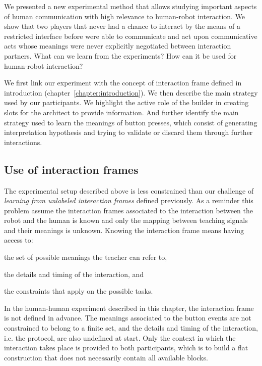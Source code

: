 We presented a new experimental method that allows studying important aspects of human communication with high relevance to human-robot interaction. We show that two players that never had a chance to interact by the means of a restricted interface before were able to communicate and act upon communicative acts whose meanings were never explicitly negotiated between interaction partners. What can we learn from the experiments? How can it be used for human-robot interaction?

We first link our experiment with the concept of interaction frame defined in introduction (chapter~\ref{chapter:introduction}). We then describe the main strategy used by our participants. We highlight the active role of the builder in creating slots for the architect to provide information. And further identify the main strategy used to learn the meanings of button presses, which consist of generating interpretation hypothesis and trying to validate or discard them through further interactions. 


\subsection{Use of interaction frames}
\label{chapter:humanexperiment:frames}

The experimental setup described above is less constrained than our challenge of \emph{learning from unlabeled interaction frames} defined previously. As a reminder this problem assume the interaction frames associated to the interaction between the robot and the human is known and only the mapping between teaching signals and their meanings is unknown. Knowing the interaction frame means having access to: \begin{inparaenum}[(a)] \item the set of possible meanings the teacher can refer to, \item the details and timing of the interaction, and \item the constraints that apply on the possible tasks. \end{inparaenum}

In the human-human experiment described in this chapter, the interaction frame is not defined in advance. The meanings associated to the button events are not constrained to belong to a finite set, and the details and timing of the interaction, i.e. the protocol, are also undefined at start. Only the context in which the interaction takes place is provided to both participants, which is to build a flat construction that does not necessarily contain all available blocks.

